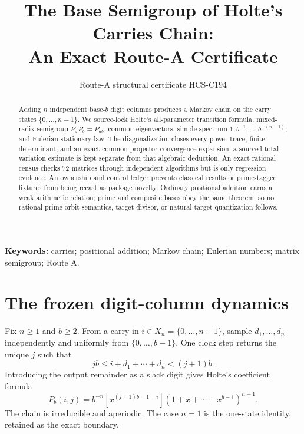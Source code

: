\documentclass[9pt]{extarticle}
\title{The Base Semigroup of Holte's Carries Chain:\\An Exact Route-A Certificate}
\author{Route-A structural certificate HCS-C194}
\date{}
\begin{document}
\maketitle
\begin{abstract}
Adding $n$ independent base-$b$ digit columns produces a Markov chain on the
carry states $\{0,\ldots,n-1\}$.  We source-lock Holte's all-parameter
transition formula, mixed-radix semigroup $P_aP_b=P_{ab}$, common eigenvectors,
simple spectrum $1,b^{-1},\ldots,b^{-(n-1)}$, and Eulerian stationary law.
The diagonalization closes every power trace, finite determinant, and an exact
common-projector convergence expansion; a sourced total-variation estimate is
kept separate from that algebraic deduction.  An exact rational census checks
72 matrices through independent algorithms but is only regression evidence.
An ownership and control ledger prevents classical results or prime-tagged
fixtures from being recast as package novelty.  Ordinary
positional addition earns a weak arithmetic relation; prime and composite
bases obey the same theorem, so no rational-prime orbit semantics, target
divisor, or natural target quantization follows.
\end{abstract}
\noindent\textbf{Keywords:} carries; positional addition; Markov chain;
Eulerian numbers; matrix semigroup; Route A.

\section{The frozen digit-column dynamics}
Fix $n\ge1$ and $b\ge2$.  From a carry-in $i\in X_n=\{0,\ldots,n-1\}$,
sample $d_1,\ldots,d_n$ independently and uniformly from
$\{0,\ldots,b-1\}$.  One clock step returns the unique $j$ such that
\[
 jb\le i+d_1+\cdots+d_n<(j+1)b.
\]
Introducing the output remainder as a slack digit gives Holte's coefficient
formula~\cite[Theorem~1]{Holte97}
\begin{equation}\label{eq:transition}
 P_b(i,j)=b^{-n}[x^{(j+1)b-1-i}]
 (1+x+\cdots+x^{b-1})^{n+1}.
\end{equation}
The chain is irreducible and aperiodic.  The case $n=1$ is the one-state
identity, retained as the exact boundary.
\end{document}
